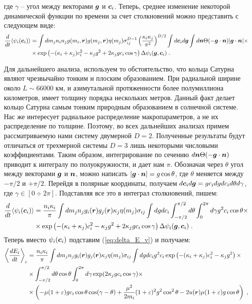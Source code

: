 где $\gamma$ -- угол между векторами $\bm{g}$ и $\bm{c}_i$. Теперь, среднее изменение некоторой динамической функции по времени
за счет столкновений можно представить с следующем виде:
\begin{equation}
  \begin{split}
    \frac{d}{dt}\langle\psi_i(\bm{c}_i)\rangle &= \int dm_jn_in_jg(m_i,\bm{r})g(m_j,\bm{r})\eta(m_j)
    \sigma^{D-1}_{ij}\left(\frac{\kappa_i\kappa_j}{\pi^2}\right)^{D/2}\int d\bm{c}_id\bm{g}\int d\bm{n}\Theta(-\bm{g}\cdot\bm{n})\vert\bm{g}\cdot\bm{n}\vert\times\\
    &\times\exp\left(-(\kappa_i+\kappa_j)c^2_i-\kappa_jg^2+2\kappa_jgc_i\cos\gamma\right)\Delta\psi_i(\bm{g},\bm{c}_i)\;.
  \end{split}
\end{equation}

Для дальнейшего анализа, используем то обстоятельство, что кольца Сатурна являют чрезвычайно тонким и плоским образованием.
При радиальной ширине около $L\sim 66 000$ км, и азимутальной протяженности более полумиллиона километров, имеет толщину 
порядка нескольких метров. Данный факт делает кольцо Сатурна самым тонким природным образованием в солнечной системе. 
Нас же интересует радиальное распределение макропараметров, а не их распределение по толщине. Поэтому, во всех дальнейших
анализах примем рассматриваемую нами систему двумерной $D=2$. Полученные результаты будут отличаться от трехмерной системы
$D=3$ лишь некоторыми числовыми коэффициентами. Таким образом, интегрирование по сечению $d\bm{n}\Theta(-\bm{g}\cdot\bm{n})$ приводит
к интегралу по полуокружности, и дает нам $\pi$. Обозначая через $\theta$ угол между векторами $\bm{g}$ и $\bm{n}$, можно написать
$\vert\bm{g}\cdot\bm{n}\vert=g\cos\theta$, где $\theta$ меняется между $-\pi/2$ и $+\pi/2$. Перейдя в полярные координаты, получаем
$d\bm{c}_id\bm{g}=gc_i dg dc_id\theta d\gamma$, где $\gamma\in[0\div 2\pi]$. Подставляя все это в интеграл столкновений, пишем:
\begin{equation}
  \begin{split}
    \frac{d}{dt}\langle\psi_i(\bm{c}_i)\rangle &=\frac{n_i\kappa_i}{\pi}\int dm_jn_jg_i(\bm{r})g_j(\bm{r})\kappa_j\eta(m_j)\sigma_{ij}
    \int dgdc_i\int_{-\pi/2}^{\pi/2}d\theta\int_0^{2\pi}d\gamma g^2c_i\cos\theta\times \\
    &\times\exp\left(-(\kappa_i+\kappa_j)c^2_i-\kappa_jg^2+2\kappa_jgc_i\cos\gamma\right)\Delta\psi_i(\bm{g},\bm{c}_i)\;.
  \end{split}
\end{equation}
Теперь вместо $\psi_i(\bm{c}_i)$ подставим (\ref{eq:delta_E_v}) и получаем:
\begin{equation}
  \begin{split}
    \left\langle\frac{dE_i}{dt}\right\rangle_c &= \frac{n_i\kappa_i}{\pi}\int dm_jn_jg_i(\bm{r})g_j(\bm{r})\kappa_j\eta(m_j)\sigma_{ij}
    \int dgdc_i g^2c_i\exp\left(-(\kappa_i+\kappa_j)c^2_i-\kappa_jg^2\right)\times\\
    &\times\int_{-\pi/2}^{\pi/2}d\theta\cos\theta\int_{0}^{2\pi}d\gamma\exp(2\kappa_jgc_i\cos\gamma)\times \\
    &\times\left(-\mu(1+\varepsilon)gc_i\cos\theta\cos(\gamma-\theta)+\frac{\mu^2}{2m_i}(1+\varepsilon)^2g^2\cos^2\theta-
    2u(\bm{r})\mu(1+\varepsilon)g\cos\theta\right)\;,
  \end{split}
\end{equation}
